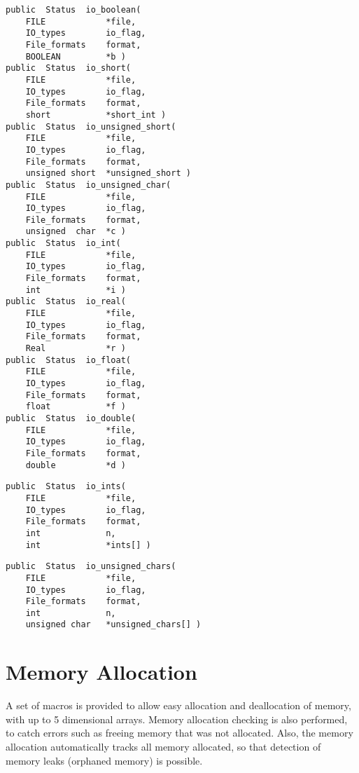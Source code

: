 {\bf\begin{verbatim}
public  Status  io_boolean(
    FILE            *file,
    IO_types        io_flag,
    File_formats    format,
    BOOLEAN         *b )
public  Status  io_short(
    FILE            *file,
    IO_types        io_flag,
    File_formats    format,
    short           *short_int )
public  Status  io_unsigned_short(
    FILE            *file,
    IO_types        io_flag,
    File_formats    format,
    unsigned short  *unsigned_short )
public  Status  io_unsigned_char(
    FILE            *file,
    IO_types        io_flag,
    File_formats    format,
    unsigned  char  *c )
public  Status  io_int(
    FILE            *file,
    IO_types        io_flag,
    File_formats    format,
    int             *i )
public  Status  io_real(
    FILE            *file,
    IO_types        io_flag,
    File_formats    format,
    Real            *r )
public  Status  io_float(
    FILE            *file,
    IO_types        io_flag,
    File_formats    format,
    float           *f )
public  Status  io_double(
    FILE            *file,
    IO_types        io_flag,
    File_formats    format,
    double          *d )
\end{verbatim}}


{\bf\begin{verbatim}
public  Status  io_ints(
    FILE            *file,
    IO_types        io_flag,
    File_formats    format,
    int             n,
    int             *ints[] )
\end{verbatim}}


{\bf\begin{verbatim}
public  Status  io_unsigned_chars(
    FILE            *file,
    IO_types        io_flag,
    File_formats    format,
    int             n,
    unsigned char   *unsigned_chars[] )
\end{verbatim}}


\section{Memory Allocation}

A set of macros is provided to allow easy allocation and deallocation
of memory, with up to 5 dimensional arrays.  Memory allocation
checking is also performed, to catch errors such as freeing memory
that was not allocated.  Also, the memory allocation automatically
tracks all memory allocated, so that detection of memory leaks
(orphaned memory) is possible.

